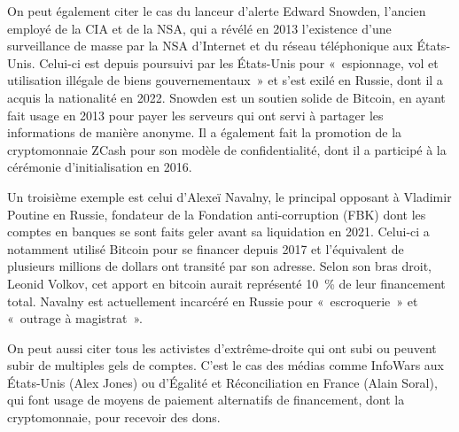 On peut également citer le cas du lanceur d'alerte Edward Snowden, l'ancien employé de la CIA et de la NSA, qui a révélé en 2013 l'existence d'une surveillance de masse par la NSA d'Internet et du réseau téléphonique aux États-Unis. Celui-ci est depuis poursuivi par les États-Unis pour «~espionnage, vol et utilisation illégale de biens gouvernementaux~» et s'est exilé en Russie, dont il a acquis la nationalité en 2022. Snowden est un soutien solide de Bitcoin, en ayant fait usage en 2013 pour payer les serveurs qui ont servi à partager les informations de manière anonyme. Il a également fait la promotion de la cryptomonnaie ZCash pour son modèle de confidentialité, dont il a participé à la cérémonie d'initialisation en 2016.

Un troisième exemple est celui d'Alexeï Navalny, le principal opposant à Vladimir Poutine en Russie, fondateur de la Fondation anti-corruption (FBK) dont les comptes en banques se sont faits geler avant sa liquidation en 2021. Celui-ci a notamment utilisé Bitcoin pour se financer depuis 2017 et l'équivalent de plusieurs millions de dollars ont transité par son adresse. Selon son bras droit, Leonid Volkov, cet apport en bitcoin aurait représenté 10~\% de leur financement total. Navalny est actuellement incarcéré en Russie pour «~escroquerie~» et «~outrage à magistrat~».

On peut aussi citer tous les activistes d'extrême-droite qui ont subi ou peuvent subir de multiples gels de comptes. C'est le cas des médias comme InfoWars aux États-Unis (Alex Jones) ou d'Égalité et Réconciliation en France (Alain Soral), qui font usage de moyens de paiement alternatifs de financement, dont la cryptomonnaie, pour recevoir des dons.

